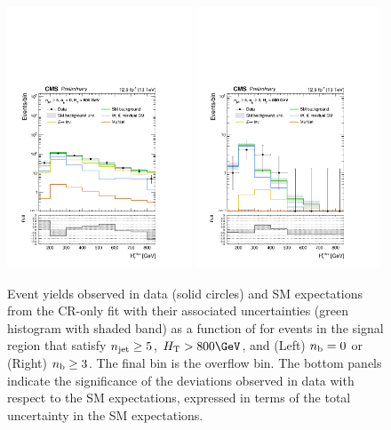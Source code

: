 \begin{figure}[tbhp]
  \begin{center}
    \includegraphics[width=0.49\textwidth]{mhtShape_eq0b_ge5j_800_Inf_fit_b.pdf} 
    \includegraphics[width=0.49\textwidth]{mhtShape_ge3b_ge5j_800_Inf_fit_b.pdf} 
  \end{center}
  \caption{Event yields observed in data (solid circles) and SM
    expectations from the CR-only fit with their associated
    uncertainties (green histogram with shaded band) as a function of
    \HTmiss for events in the signal region that satisfy $n_{\text{jet}} \geq
    5$, $\scalht > 800\GeV$, and (Left) $n_{\text{b}} = 0$ or (Right) $n_{\text{b}} \geq
    3$. The final bin is the overflow bin. The bottom panels indicate
    the significance of the deviations observed in data with respect
    to the SM expectations, expressed in terms of the total
    uncertainty in the SM expectations. 
    \label{fig:mht-templates} 
  }
\end{figure}
